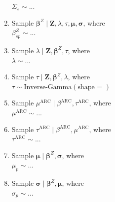 \documentclass[12pt]{article}
\def\bbeta{\pmb{\beta}}
\def\bmu{\pmb{\mu}}
\def\bsigma{\pmb{\sigma}}
\def\bZ{\pmb{Z}}
\begin{document}
\begin{enumerate}
$
\Sigma_s \sim ...
$
\item Sample $\bbeta^Z \mid \bZ, \lambda, \tau, \bmu, \bsigma$, where \\
$
\beta^Z_{sp} \sim ...
$
\item Sample $\lambda \mid \bZ, \bbeta^Z, \tau$, where \\
$
\lambda \sim ...
$
\item Sample $\tau \mid \bZ, \bbeta^Z, \lambda$, where \\
$
\tau \sim \text{Inverse-Gamma}(\text{shape = })
$
\item Sample $\mu^\text{ARC} \mid \beta^\text{ARC}, \tau^\text{ARC}$, where \\
$
\mu^\text{ARC} \sim ...
$
\item Sample $\tau^\text{ARC} \mid \beta^\text{ARC}, \mu^\text{ARC}$, where \\
$
\tau^\text{ARC} \sim ...
$
\item Sample $\bmu \mid \bbeta^Z, \bsigma$, where \\
$
\mu_p \sim ...
$
\item Sample $\bsigma \mid \bbeta^Z, \bmu$, where \\
$
\sigma_p \sim ...
$
\end{enumerate}






\end{document}
